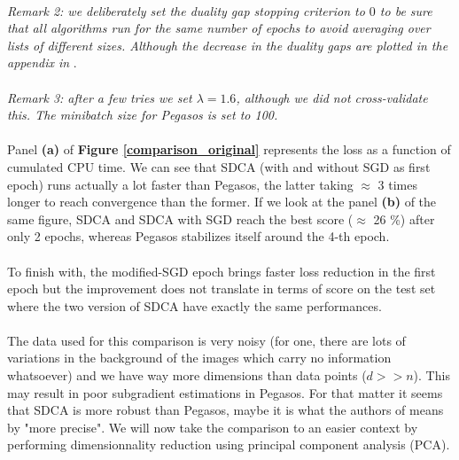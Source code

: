 \documentclass[10pt,a4paper]{article}
\begin{document}
\paragraph{}
\textit{Remark 2: we deliberately set the duality gap stopping criterion to $0$ to be sure that all algorithms run for the same number of epochs to avoid averaging over lists of different sizes. Although the decrease in the duality gaps are plotted in the appendix in }.

\paragraph{}
\textit{Remark 3: after a few tries we set $\lambda=1.6$, although we did not cross-validate this. The minibatch size for Pegasos is set to 100.}


\paragraph{}
Panel \textbf{(a)} of \textbf{Figure \ref{comparison_original}} represents the loss as a function of cumulated CPU time. We can see that SDCA (with and without SGD as first epoch) runs actually a lot faster than Pegasos, the latter taking $\approx$ 3 times longer to reach convergence than the former.  If we look at the panel \textbf{(b)} of the same figure, SDCA and SDCA with SGD reach the best score ($\approx$ 26 \%) after only 2 epochs, whereas Pegasos stabilizes itself around the 4-th epoch. 


\paragraph{}
To finish with, the modified-SGD epoch brings faster loss reduction in the first epoch but the improvement does not translate in terms of score on the test set where the two version of SDCA have exactly the same performances.

\paragraph{}
The data used for this comparison is very noisy (for one, there are lots of variations in the background of the images which carry no information whatsoever) and we have way more dimensions than data points ($d>>n$). This may result in poor subgradient estimations in Pegasos. For that matter it seems that SDCA is more robust than Pegasos, maybe it is what the authors of \cite{1} means by "more precise". We will now take the comparison to an easier context by performing dimensionnality reduction using principal component analysis (PCA).
\end{document}
